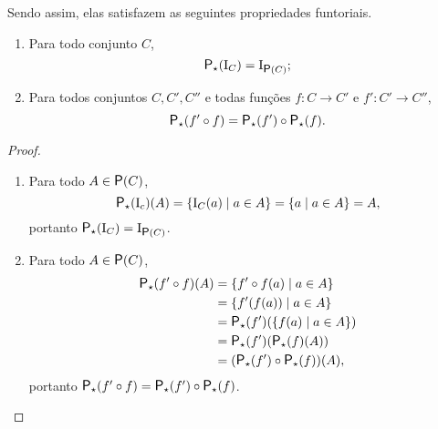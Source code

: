 Sendo assim, elas satisfazem as seguintes propriedades funtoriais.

\begin{proposition}
	\begin{enumerate}
	\item Para todo conjunto $C$,
		\begin{equation*}
		\p\emp(\Id_C) = \Id_{\begin{footnotesize}\p\end{footnotesize}(C)};
		\end{equation*}
	\item Para todos conjuntos $C,C',C''$ e todas funções $f\colon C \to C'$ e $f'\colon C' \to C''$,
		\begin{equation*}
		\p\emp(f' \circ f) = \p\emp(f') \circ \p\emp(f).
		\end{equation*}
	\end{enumerate}
\end{proposition}
\begin{proof}
	\begin{enumerate}
	\item Para todo $A \in \p(C)$,
		\begin{equation*}
		\p\emp(\Id_c)(A) = \set{\Id_C(a)}{a \in A} = \set{a}{a \in A} = A,
		\end{equation*}
portanto $\p\emp(\Id_C) = \Id_{\begin{footnotesize}\p\end{footnotesize}(C)}$.

	\item Para todo $A \in \p(C)$,
		\begin{align*}
		\p\emp(f' \circ f)(A) &= \set{f' \circ f(a)}{a \in A} \\
			&= \set{f'(f(a))}{a \in A} \\
			&= \p\emp(f')(\set{f(a)}{a \in A}) \\
			&= \p\emp(f')(\p\emp(f)(A)) \\
			&= (\p\emp(f') \circ \p\emp(f))(A),
		\end{align*}
portanto $\p\emp(f' \circ f) = \p\emp(f') \circ \p\emp(f)$.
	\end{enumerate}
\end{proof}

